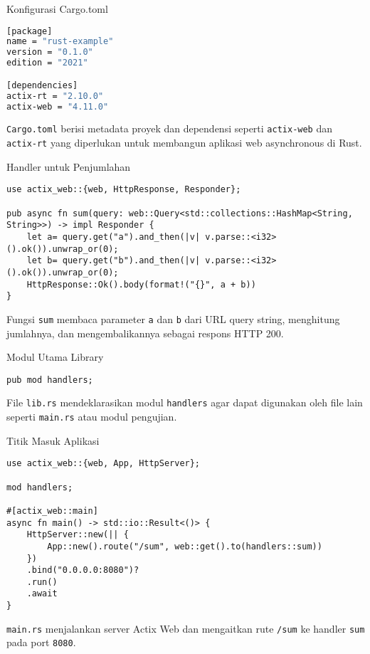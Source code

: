 \documentclass[aspectratio=169, table]{beamer}
\begin{document}
\begin{frame}[fragile]{Konfigurasi Cargo.toml}
\begin{lstlisting}[language=bash]
[package]
name = "rust-example"
version = "0.1.0"
edition = "2021"

[dependencies]
actix-rt = "2.10.0"
actix-web = "4.11.0"
\end{lstlisting}

\texttt{Cargo.toml} berisi metadata proyek dan dependensi seperti \texttt{actix-web} dan \texttt{actix-rt} yang diperlukan untuk membangun aplikasi web asynchronous di Rust.
\end{frame}


\begin{frame}[fragile]{Handler untuk Penjumlahan}
\begin{lstlisting}[style=RustStyle]
use actix_web::{web, HttpResponse, Responder};

pub async fn sum(query: web::Query<std::collections::HashMap<String, String>>) -> impl Responder {
	let a= query.get("a").and_then(|v| v.parse::<i32>().ok()).unwrap_or(0);
	let b= query.get("b").and_then(|v| v.parse::<i32>().ok()).unwrap_or(0);
	HttpResponse::Ok().body(format!("{}", a + b))
}
\end{lstlisting}

Fungsi \texttt{sum} membaca parameter \texttt{a} dan \texttt{b} dari URL query string, menghitung jumlahnya, dan mengembalikannya sebagai respons HTTP 200.
\end{frame}

\begin{frame}[fragile]{Modul Utama Library}
\begin{lstlisting}[style=RustStyle, caption={src/lib.rs}]
pub mod handlers;
\end{lstlisting}

File \texttt{lib.rs} mendeklarasikan modul \texttt{handlers} agar dapat digunakan oleh file lain seperti \texttt{main.rs} atau modul pengujian.
\end{frame}

\begin{frame}[fragile]{Titik Masuk Aplikasi}
	\vspace{20pt}
\begin{lstlisting}[style=RustStyle]
use actix_web::{web, App, HttpServer};

mod handlers;

#[actix_web::main]
async fn main() -> std::io::Result<()> {
	HttpServer::new(|| {
		App::new().route("/sum", web::get().to(handlers::sum))
	})
	.bind("0.0.0.0:8080")?
	.run()
	.await
}
\end{lstlisting}

\texttt{main.rs} menjalankan server Actix Web dan mengaitkan rute \texttt{/sum} ke handler \texttt{sum} pada port \texttt{8080}.
\end{frame}
\end{document}

